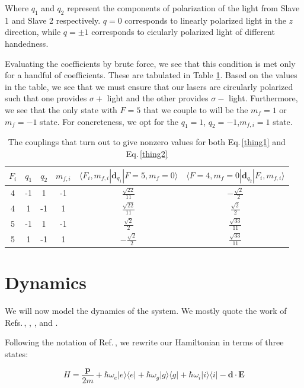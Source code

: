 Where $q_1$ and $q_2$ represent the components of polarization of the light from Slave 1 and Slave 2 respectively. $q=0$ corresponds to linearly polarized light in the $z$ direction, while $q=\pm 1$ corresponds to cicularly polarized light of different handedness.

Evaluating the coefficients by brute force, we see that this condition is met only for a handful of coefficients. These are tabulated in Table \ref{nonzeroCG}. Based on the values in the table, we see that we must ensure that our lasers are circularly polarized such that one provides $\sigma+$ light and the other provides $\sigma-$ light. Furthermore, we see that the only state with $F=5$ that we couple to will be the $m_f=1$ or $m_f=-1$ state. For concreteness, we opt for the $q_1=1$, $q_2=-1$,$m_{f,i}=1$ state. 

\begin{table}[h!]
\centering
\begin{tabular}{|c|c|c|c|c|c|}
$F_i$ & $q_1$ & $q_2$ & $m_{f,i}$ &$\langle  F_i,m_{f,i}|\mathbf{d}_{q_1}|F=5,m_f=0\rangle$&$\langle F=4,m_f=0|\mathbf{d}_{q_2}|F_i,m_{f,i}\rangle$ \\ 
\hline
4 & -1 & 1 & -1 &$ \frac{\sqrt{22}}{11} $&$ - \frac{\sqrt{2}}{2} $ \\ 
4 & 1 & -1 & 1 &$ \frac{\sqrt{22}}{11} $&$ \frac{\sqrt{2}}{2} $ \\ 
5 & -1 & 1 & -1 &$ \frac{\sqrt{2}}{2} $&$ \frac{\sqrt{33}}{11} $ \\ 
5 & 1 & -1 & 1 &$ - \frac{\sqrt{2}}{2} $&$ \frac{\sqrt{33}}{11} $ \\
\end{tabular}
\caption{The couplings that turn out to give nonzero values for both Eq.\,\ref{thing1} and Eq.\,\ref{thing2}}
\label{nonzeroCG}
\end{table}

\section{Dynamics}\label{dynamicsSection}

We will now model the dynamics of the system. We mostly quote the work of Refs.\,\cite{Young1997363}, \cite{gustavsonThesis}, \cite{footAtomicPhysics}, \cite{cjeDiss} and \cite{RamanBeamSplit}.

Following the notation of Ref.\,\cite{Young1997363}, we rewrite our Hamiltonian in terms of three states:

\begin{equation}
H=\frac{\mathbf{p}}{2m} + 
\hbar\omega_e |e\rangle\langle e | +
\hbar\omega_g |g\rangle\langle g | +
\hbar\omega_i |i\rangle\langle i | -
\mathbf{d}\cdot\mathbf{E}
\end{equation}

